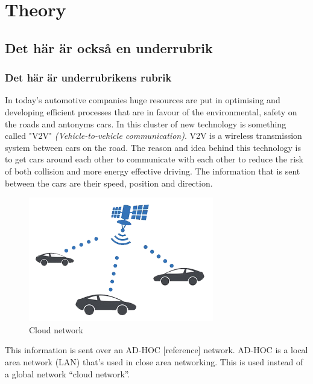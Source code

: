 \section{Theory}
\subsection{Det här är också en underrubrik}
\subsubsection{Det här är underrubrikens rubrik}
In today's automotive companies huge resources are put in optimising and developing efficient processes that are in favour of the environmental, safety on the roads and antonyms cars. In this cluster of new technology is something called "V2V" \textit{(Vehicle-to-vehicle communication)}. V2V is a wireless transmission system between cars on the road. The reason and idea behind this technology is to get cars around each other to communicate with each other to reduce the risk of both collision and more energy effective driving. The information that is sent between the cars are their speed, position and direction.

\begin{figure}[H]
    \centering
    \includegraphics{images/V2VGlobal.png}
    \caption{Cloud network}
\end{figure}


This information is sent over an AD-HOC [reference] network. AD-HOC is a local area network (LAN) that's used in close area networking. This is used instead of a global network “cloud network”. 


